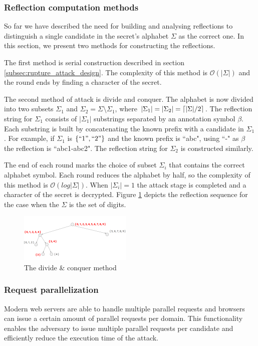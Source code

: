 \subsubsection{Reflection computation methods}\label{subsec:reflectionmethods}
So far we have described the need for building and analysing reflections to
distinguish a single candidate in the secret's alphabet $\Sigma$ as the correct
one. In this section, we present two methods for constructing the reflections.

The first method is serial construction described in section
\ref{subsec:rupture_attack_design}. The complexity of this method is
$\mathcal{O}(|\Sigma|)$ and the round ends by finding a character of the secret.

The second method of attack is divide and conquer. The alphabet is now divided
into two subsets $\Sigma_1$ and $\Sigma_2 = \Sigma \setminus \Sigma_1$, where
$|\Sigma_1| = |\Sigma_2| = \lceil|\Sigma| / 2\rceil$. The reflection string for
$\Sigma_1$ consists of $|\Sigma_1|$ substrings separated by an annotation symbol
$\beta$. Each substring is built by concatenating the known prefix with a
candidate in $\Sigma_1$. For example, if $\Sigma_1$ is $\{``1", ``2"\}$ and the
known prefix is ``abc", using ``-" as $\beta$ the reflection is ``abc1-abc2".
The reflection string for $\Sigma_2$ is constructed similarly.

The end of each round marks the choice of subset $\Sigma_i$ that contains the
correct alphabet symbol. Each round reduces the alphabet by half, so the
complexity of this method is $\mathcal{O}(log|\Sigma|)$. When $|\Sigma_i| = 1$
the attack stage is completed and a character of the secret is decrypted.
Figure \ref{fig:divide_and_conquer} depicts the reflection sequence for the case
when the $\Sigma$ is the set of digits.

   \begin{figure}[thpb]
      \centering
          \includegraphics[width=0.48\textwidth]{figures/divide_and_conquer.png}
      \caption{The divide \& conquer method}
      \label{fig:divide_and_conquer}
   \end{figure}

\subsubsection{Request parallelization}\label{subsec:parallel}
Modern web servers are able to handle multiple parallel requests and
browsers can issue a certain amount of parallel requests per domain. This
functionality enables the adversary to issue multiple parallel requests per
candidate and efficiently reduce the execution time of the attack.


